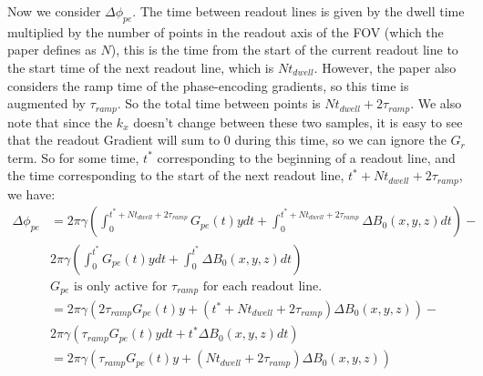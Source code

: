 \documentclass{article}
\begin{document}
Now we consider $\Delta \phi_{pe}$. The time between readout lines is given by the dwell time multiplied by the number of
points in the readout axis of the FOV (which the paper defines as $N$), this is the time from the start of the current readout line
to the start time of the next readout line, which is $Nt_{dwell}$. However, the paper also considers
the ramp time of the phase-encoding gradients, so this time is augmented by $\tau_{ramp}$. So the total time between points
is $Nt_{dwell} + 2\tau_{ramp}$. We also note that since the $k_x$ doesn't change between these two samples, it is
easy to see that the readout Gradient will sum to 0 during this time, so we can ignore the $G_r$ term. So for some time,
$t^{*}$ corresponding to the beginning of a readout line, and the time corresponding to the start of the next readout line,
$t^{*} + Nt_{dwell} + 2\tau_{ramp}$, we have:
\begin{align*}
    \Delta \phi_{pe} &= 2\pi\gamma\left(\int_{0}^{t^{*} + Nt_{dwell} + 2\tau_{ramp}}G_{pe}(t)y dt + \int_{0}^{t^{*} + Nt_{dwell} + 2\tau_{ramp}}\Delta B_0(x,y,z) dt\right) - \\
    &2\pi\gamma\left(\int_{0}^{t^{*}}G_{pe}(t)y dt + \int_{0}^{t^{*}}\Delta B_0(x,y,z) dt\right) \\
    &G_{pe} \textrm{ is only active for } \tau_{ramp} \textrm { for each readout line.} \\
    &= 2\pi\gamma\left(2\tau_{ramp}G_{pe}(t)y + (t^{*} + Nt_{dwell} + 2\tau_{ramp})\Delta B_0(x,y,z)\right) - \\
    &2\pi\gamma\left(\tau_{ramp}G_{pe}(t)y dt + t^{*}\Delta B_0(x,y,z) dt\right) \\
    &= 2\pi\gamma\left(\tau_{ramp}G_{pe}(t)y + (Nt_{dwell} + 2\tau_{ramp})\Delta B_0(x,y,z)\right)
\end{align*}
\end{document}

